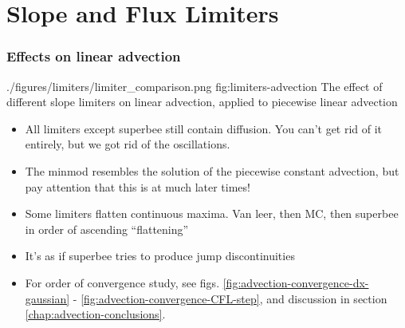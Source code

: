 \section{Slope and Flux Limiters}







\subsubsection{Effects on linear advection}


\quickfigcap
	{./figures/limiters/limiter_comparison.png}
	{fig:limiters-advection}
	{The effect of different slope limiters on linear advection, applied to piecewise linear advection}




\begin{itemize}

	\item All limiters except superbee still contain diffusion. You can't get rid of it entirely, but we got rid of the oscillations.
	
	\item The minmod resembles the solution of the piecewise constant advection, but pay attention that this is at much later times!
	
	\item Some limiters flatten continuous maxima. Van leer, then MC, then superbee in order of ascending ``flattening''
	
	\item It's as if superbee tries to produce jump discontinuities
	
	\item For order of convergence study, see figs. \ref{fig:advection-convergence-dx-gaussian} - \ref{fig:advection-convergence-CFL-step}, and discussion in section \ref{chap:advection-conclusions}.

\end{itemize}







